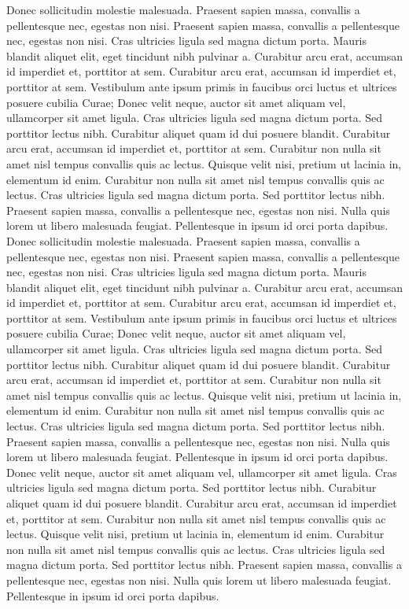 \documentclass{article}
\begin{document}
Donec sollicitudin molestie malesuada. Praesent sapien massa, convallis a pellentesque nec, egestas non nisi. Praesent sapien massa, convallis a pellentesque nec, egestas non nisi. Cras ultricies ligula sed magna dictum porta. Mauris blandit aliquet elit, eget tincidunt nibh pulvinar a. Curabitur arcu erat, accumsan id imperdiet et, porttitor at sem. Curabitur arcu erat, accumsan id imperdiet et, porttitor at sem. Vestibulum ante ipsum primis in faucibus orci luctus et ultrices posuere cubilia Curae; Donec velit neque, auctor sit amet aliquam vel, ullamcorper sit amet ligula. Cras ultricies ligula sed magna dictum porta. Sed porttitor lectus nibh. Curabitur aliquet quam id dui posuere blandit. Curabitur arcu erat, accumsan id imperdiet et, porttitor at sem. Curabitur non nulla sit amet nisl tempus convallis quis ac lectus. Quisque velit nisi, pretium ut lacinia in, elementum id enim. Curabitur non nulla sit amet nisl tempus convallis quis ac lectus. Cras ultricies ligula sed magna dictum porta. Sed porttitor lectus nibh. Praesent sapien massa, convallis a pellentesque nec, egestas non nisi. Nulla quis lorem ut libero malesuada feugiat. Pellentesque in ipsum id orci porta dapibus.
Donec sollicitudin molestie malesuada. Praesent sapien massa, convallis a pellentesque nec, egestas non nisi. Praesent sapien massa, convallis a pellentesque nec, egestas non nisi. Cras ultricies ligula sed magna dictum porta. Mauris blandit aliquet elit, eget tincidunt nibh pulvinar a. Curabitur arcu erat, accumsan id imperdiet et, porttitor at sem. Curabitur arcu erat, accumsan id imperdiet et, porttitor at sem. Vestibulum ante ipsum primis in faucibus orci luctus et ultrices posuere cubilia Curae; Donec velit neque, auctor sit amet aliquam vel, ullamcorper sit amet ligula. Cras ultricies ligula sed magna dictum porta. Sed porttitor lectus nibh. Curabitur aliquet quam id dui posuere blandit. Curabitur arcu erat, accumsan id imperdiet et, porttitor at sem. Curabitur non nulla sit amet nisl tempus convallis quis ac lectus. Quisque velit nisi, pretium ut lacinia in, elementum id enim. Curabitur non nulla sit amet nisl tempus convallis quis ac lectus. Cras ultricies ligula sed magna dictum porta. Sed porttitor lectus nibh. Praesent sapien massa, convallis a pellentesque nec, egestas non nisi. Nulla quis lorem ut libero malesuada feugiat. Pellentesque in ipsum id orci porta dapibus.
 Donec velit neque, auctor sit amet aliquam vel, ullamcorper sit amet ligula. Cras ultricies ligula sed magna dictum porta. Sed porttitor lectus nibh. Curabitur aliquet quam id dui posuere blandit. Curabitur arcu erat, accumsan id imperdiet et, porttitor at sem. Curabitur non nulla sit amet nisl tempus convallis quis ac lectus. Quisque velit nisi, pretium ut lacinia in, elementum id enim. Curabitur non nulla sit amet nisl tempus convallis quis ac lectus. Cras ultricies ligula sed magna dictum porta. Sed porttitor lectus nibh. Praesent sapien massa, convallis a pellentesque nec, egestas non nisi. Nulla quis lorem ut libero malesuada feugiat. Pellentesque in ipsum id orci porta dapibus.
\pend
\endnumbering
\end{document}
